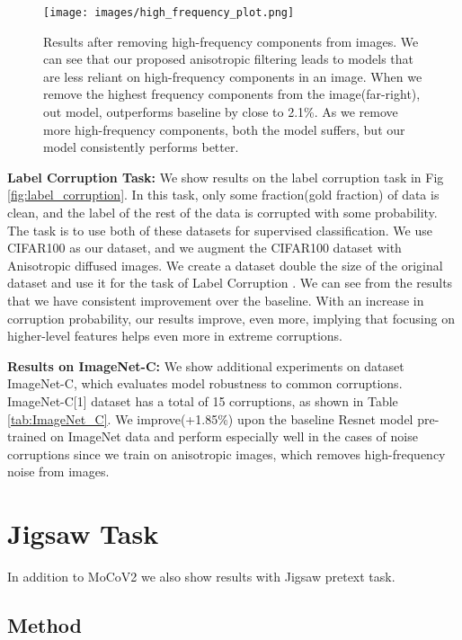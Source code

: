 \documentclass{bmvc2k}
\begin{document}
\begin{figure}[t]
    \centering
\texttt{[image: images/high\_frequency\_plot.png]}
\caption{Results after removing high-frequency components from images. We can see that our proposed anisotropic filtering leads to models that are less reliant on high-frequency components in an image. When we remove the highest frequency components from the image(far-right), out model, outperforms baseline by close to 2.1\%. As we remove more high-frequency components, both the model suffers, but our model consistently performs better.}
\label{fig:remove_high_frequency_component}
\end{figure}

 
\textbf{Label Corruption Task:}
We show results on the label corruption task in Fig \ref{fig:label_corruption}. In this task, \cite{hendrycks2019selfsupervised} only some fraction(gold fraction) of data is clean, and the label of the rest of the data is corrupted with some probability. The task is to use both of these datasets for supervised classification.
 We use CIFAR100 as our dataset, and we augment the CIFAR100 dataset with Anisotropic diffused images. We create a dataset double the size of the original dataset and use it for the task of Label Corruption \cite{hendrycks2019selfsupervised}. 
We can see from the results that we have consistent improvement over the baseline. With an increase in corruption probability, our results improve, even more, implying that focusing on higher-level features helps even more in extreme corruptions.

\textbf{Results on ImageNet-C:}
We show additional experiments on dataset ImageNet-C\cite{Hendrycks2019BenchmarkingNN}, which evaluates model robustness to common corruptions. ImageNet-C[1] dataset has a total of 15 corruptions, as shown in Table \ref{tab:ImageNet_C}. 
We improve(+1.85\%) upon the baseline Resnet model pre-trained on ImageNet data and perform especially well in the cases of noise corruptions since we train on anisotropic images, which removes high-frequency noise from images.




\section{Jigsaw Task}
In addition to MoCoV2 we also show results with Jigsaw pretext task. \subsection{Method}
\end{document}
